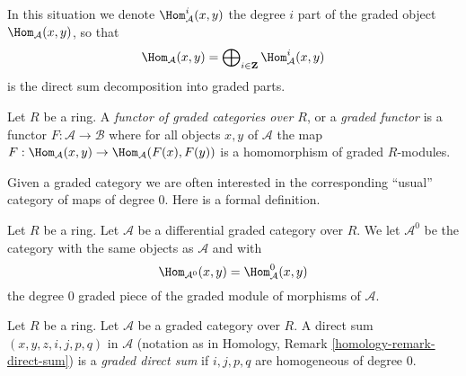 \noindent
In this situation we denote $\Hom_\mathcal{A}^i(x, y)$ the degree $i$
part of the graded object $\Hom_\mathcal{A}(x, y)$, so that
$$
\Hom_\mathcal{A}(x, y) =
\bigoplus\nolimits_{i \in \mathbf{Z}} \Hom_\mathcal{A}^i(x, y)
$$
is the direct sum decomposition into graded parts.

\begin{definition}
\label{definition-functor-graded-categories}
Let $R$ be a ring. A {\it functor of graded categories over $R$}, or a
{\it graded functor}
is a functor $F : \mathcal{A} \to \mathcal{B}$ where for all objects
$x, y$ of $\mathcal{A}$ the map
$F : \Hom_\mathcal{A}(x, y) \to \Hom_\mathcal{A}(F(x), F(y))$
is a homomorphism of graded $R$-modules.
\end{definition}

\noindent
Given a graded category we are often interested in the
corresponding ``usual'' category of maps of degree $0$.
Here is a formal definition.

\begin{definition}
\label{definition-H0-of-graded-category}
Let $R$ be a ring. Let $\mathcal{A}$ be a differential graded category
over $R$. We let {\it $\mathcal{A}^0$} be the category with the
same objects as $\mathcal{A}$ and with
$$
\Hom_{\mathcal{A}^0}(x, y) = \Hom^0_\mathcal{A}(x, y)
$$
the degree $0$ graded piece of the graded module of morphisms of
$\mathcal{A}$.
\end{definition}

\begin{definition}
\label{definition-graded-direct-sum}
Let $R$ be a ring. Let $\mathcal{A}$ be a graded category over $R$.
A direct sum $(x, y, z, i, j, p, q)$ in $\mathcal{A}$ (notation as in
Homology, Remark \ref{homology-remark-direct-sum})
is a {\it graded direct sum} if $i, j, p, q$ are homogeneous
of degree $0$.
\end{definition}

